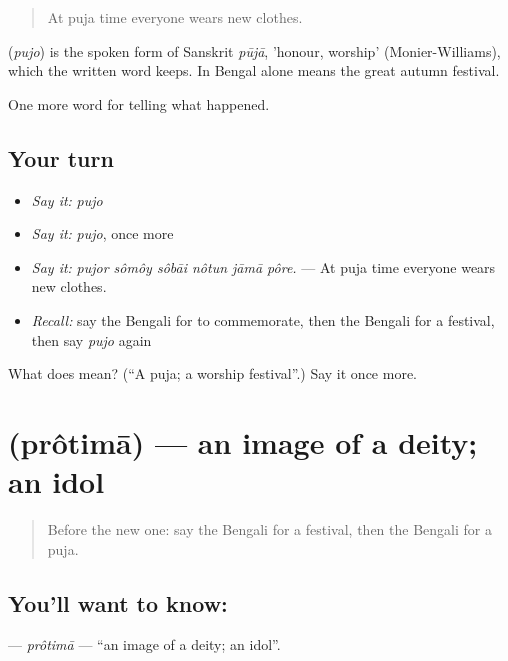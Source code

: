 \begin{quote}
At puja time everyone wears new clothes.
\end{quote}

\begin{cousinweb}
\textbf{} (\emph{pujo}) is the spoken form of Sanskrit \emph{pūjā}, 'honour, worship' (Monier-Williams), which the written word  keeps. In Bengal  alone means the great autumn festival.
\end{cousinweb}

\begin{grammarlens}[title={What you've built}]
One more word for telling what happened.
\end{grammarlens}

\subsection*{Your turn}
\begin{itemize}
\raggedright
  \item \emph{Say it:} \emph{pujo}
  \item \emph{Say it:} \emph{pujo}, once more
  \item \emph{Say it:} \emph{pujor sômôy sôbāi nôtun jāmā pôre.} — At puja time everyone wears new clothes.
  \item \emph{Recall:} say the Bengali for to commemorate, then the Bengali for a festival, then say \emph{pujo} again
\end{itemize}

\begin{tcolorbox}[breakable,colback=teal!4,colframe=teal!35!black,title={Before you move on}]
What does  mean? (\textquotedblleft{}A puja; a worship festival\textquotedblright{}.) Say it once more.
\end{tcolorbox}
\section[\texorpdfstring{\bn{প্রতিমা} (prôtimā)}{প্রতিমা (prôtimā)}]{ (prôtimā) — an image of a deity; an idol}

\label{lesson:BN-C304-protima}



\begin{quote}
Before the new one: say the Bengali for a festival, then the Bengali for a puja.
\end{quote}

\subsection*{You'll want to know: }
\textbf{} — \emph{prôtimā} — \textquotedblleft{}an image of a deity; an idol\textquotedblright{}.

